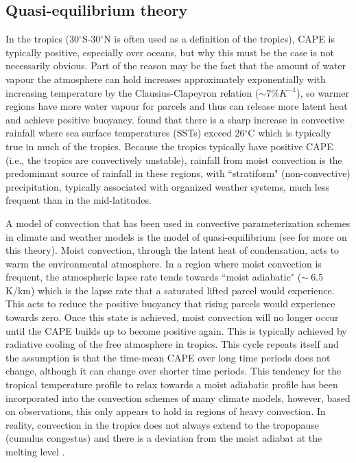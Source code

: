 \documentclass[letterpaper,12pt,titlepage,oneside,final]{book}
\begin{document}
\subsection{Quasi-equilibrium theory}\label{QET}

In the tropics (30$^\circ$S-30$^\circ$N is often used as a definition of the tropics), CAPE is typically positive, especially over oceans, but why this must be the case is not necessarily obvious. Part of the reason may be the fact that the amount of water vapour the atmosphere can hold increases approximately exponentially with increasing temperature by the Clausius-Clapeyron relation ($\sim{7\%}K^{-1}$), so warmer regions have more water vapour for parcels and thus can release more latent heat and achieve positive buoyancy. \citep{folkins_ian_tropical_2003} found that there is a sharp increase in convective rainfall where sea surface temperatures (SSTs) exceed 26$^{\circ}$C which is typically true in much of the tropics. Because the tropics typically have positive CAPE (i.e., the tropics are convectively unstable), rainfall from moist convection is the predominant source of rainfall in these regions, with ``stratiform" (non-convective) precipitation, typically associated with organized weather systems, much less frequent than in the mid-latitudes.

A model of convection that has been used in convective parameterization schemes in climate and weather models is the model of quasi-equilibrium \citep{arakawa_and_schubert_interaction_1974} (see \citep{emanuel_quasi-equilibrium_2007} for more on this theory). Moist convection, through the latent heat of condensation, acts to warm the environmental atmosphere. In a region where moist convection is frequent, the atmospheric lapse rate tends towards ``moist adiabatic" ($\sim{~6.5}$K/km) which is the lapse rate that a saturated lifted parcel would experience. This acts to reduce the positive buoyancy that rising parcels would experience towards zero. Once this state is achieved, moist convection will no longer occur until the CAPE builds up to become positive again. This is typically achieved by radiative cooling of the free atmosphere in tropics. This cycle repeats itself and the assumption is that the time-mean CAPE over long time periods does not change, although it can change over shorter time periods. This tendency for the tropical temperature profile to relax towards a moist adiabatic profile has been incorporated into the convection schemes of many climate models, however, based on observations, this only appears to hold in regions of heavy convection. In reality, convection in the tropics does not always extend to the tropopause (cumulus congestus) and there is a deviation from the moist adiabat at the melting level \citep{folkins_melting_2013}.
\end{document}
